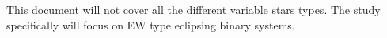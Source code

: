 This document will not cover all the different variable stars types. 
The study specifically will focus on EW type eclipsing binary systems.  

